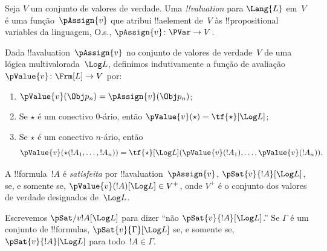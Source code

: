 \documentclass[../../../include/open-logic-section]{subfiles}
\begin{document}


\begin{defn}[!!^{valuation}s] 
Seja $V$ um conjunto de valores de verdade. Uma \emph{!!{valuation}} para
$\Lang{L}$ em~$V$ é uma
função~$\pAssign{v}$ que atribui !!a{element} de~$V$ às
!!{propositional variable}s da linguagem, O.s.\@, $\pAssign{v} \colon
\PVar \to V$.
\end{defn}

\begin{defn}
  Dada !!a{valuation}~$\pAssign{v}$ no conjunto de valores de verdade~$V$ de uma
  lógica multivalorada~$\Log L$, definimos indutivamente a função de avaliação
  $\pValue{v} \colon \Frm[L] \to V$ por:
  \begin{enumerate}
    \item $\pValue{v}(\Obj p_n) = \pAssign{v}(\Obj p_n)$; 
    \item Se $\star$ é um conectivo $0$-ário, então $\pValue{v}(\star)  = \tf{\star}[\Log L]$;
    \item Se $\star$ é um conectivo $n$-ário, então 
    \[
      \pValue{v}(\star(!A_1, \dots, !A_n)) = \tf{\star}[\Log L]
      (\pValue{v}(!A_1), \dots, \pValue{v}(!A_n)).
    \]
  \end{enumerate}
\end{defn}

\begin{defn}[Satisfação]
 A !!{formula}~$!A$ é \emph{satisfeita}
  por !!a{valuation}~$\pAssign{v}$, $\pSat{v}{!A}[\Log L]$, se, e somente se,
  $\pValue{v}(!A)[\Log L] \in V^+$, onde $V^+$ é o conjunto dos
  valores de verdade designados de~$\Log L$. 
  
  Escrevemos $\pSat/{v}{!A}[\Log L]$ para dizer ``não $\pSat{v}{!A}[\Log
  L]$.'' Se $\Gamma$ é um conjunto de !!{formula}s, $\pSat{v}{\Gamma}[\Log
  L]$ se, e somente se, $\pSat{v}{!A}[\Log L]$ para todo~$!A \in \Gamma$.
\end{defn}
\end{document}
